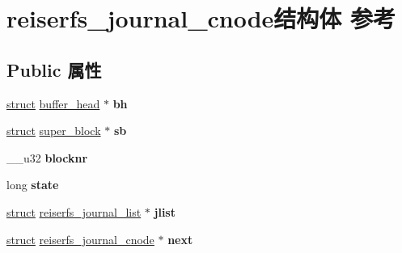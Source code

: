 \hypertarget{structreiserfs__journal__cnode}{}\section{reiserfs\+\_\+journal\+\_\+cnode结构体 参考}
\label{structreiserfs__journal__cnode}
\subsection*{Public 属性}
\begin{DoxyCompactItemize}
\item 
\mbox{\label{structreiserfs__journal__cnode_a173a8571530dedd37d219e19b791977b}} 
\hyperlink{interfacestruct}{struct} \hyperlink{structbuffer__head}{buffer\+\_\+head} $\ast$ {\bfseries bh}
\item 
\mbox{\label{structreiserfs__journal__cnode_a54106f2c08d2cca697a437275882dc79}} 
\hyperlink{interfacestruct}{struct} \hyperlink{structsuper__block}{super\+\_\+block} $\ast$ {\bfseries sb}
\item 
\mbox{\label{structreiserfs__journal__cnode_a64b0db6efa359a9fad8d727bba45556e}} 
\+\_\+\+\_\+u32 {\bfseries blocknr}
\item 
\mbox{\label{structreiserfs__journal__cnode_a35fb05ae52aa5eead183466001879e3b}} 
long {\bfseries state}
\item 
\mbox{\label{structreiserfs__journal__cnode_a8ec3fdd91d21341bfcbc450d94b94235}} 
\hyperlink{interfacestruct}{struct} \hyperlink{structreiserfs__journal__list}{reiserfs\+\_\+journal\+\_\+list} $\ast$ {\bfseries jlist}
\item 
\mbox{\label{structreiserfs__journal__cnode_a1463b987188780cba17fa6b359bb9c8c}} 
\hyperlink{interfacestruct}{struct} \hyperlink{structreiserfs__journal__cnode}{reiserfs\+\_\+journal\+\_\+cnode} $\ast$ {\bfseries next}
\item 
\mbox{\label{structreiserfs__journal__cnode_a41d2457773f9969e87c39015ac330529}} 

\end{DoxyCompactItemize}
